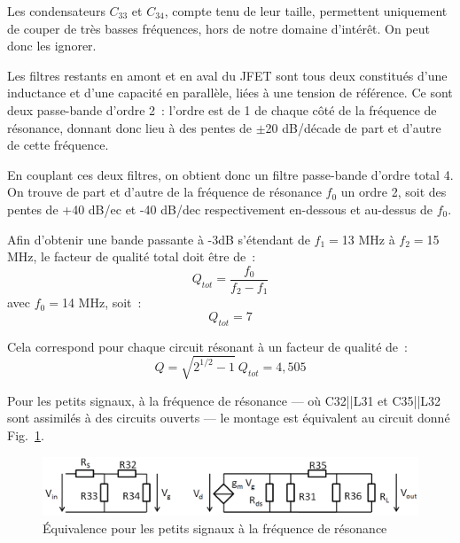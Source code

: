 \documentclass{article}
\begin{document}

Les condensateurs $C_{33}$ et $C_{34}$, compte tenu de leur taille, permettent uniquement de couper de très basses fréquences, hors de notre domaine d'intérêt. On peut donc les ignorer.

Les filtres restants en amont et en aval du JFET sont tous deux constitués d'une inductance et d'une capacité en parallèle, liées à une tension de référence. Ce sont deux passe-bande d'ordre 2~: l'ordre est de 1 de chaque côté de la fréquence de résonance, donnant donc lieu à des pentes de $\pm$20 dB/décade de part et d'autre de cette fréquence.

En couplant ces deux filtres, on obtient donc un filtre passe-bande d'ordre total 4. On trouve de part et d'autre de la fréquence de résonance $f_0$ un ordre 2, soit des pentes de +40 dB/ec et -40 dB/dec respectivement en-dessous et au-dessus de $f_0$.



Afin d'obtenir une bande passante à -3dB s'étendant de $f_1 = $13 MHz à $f_2 = $15 MHz, le facteur de qualité total doit être de~:
\begin{equation*}
Q_{tot} = \frac{f_0}{f_2-f_1}
\end{equation*}
avec $f_0 = $14 MHz, soit~:
\begin{equation*}
Q_{tot} = 7
\end{equation*}

Cela correspond pour chaque circuit résonant à un facteur de qualité de~:
\begin{equation*}
Q = \sqrt{2^{1/2}-1}~Q_{tot} = 4,505
\end{equation*}




Pour les petits signaux, à la fréquence de résonance --- où C32||L31 et C35||L32 sont assimilés à des circuits ouverts --- le montage est équivalent au circuit donné Fig.~\ref{fig:eqFET}.

\begin{figure}[h]
	\centering
	\includegraphics[width=.8\textwidth]{eqFet}
	\caption{Équivalence pour les petits signaux à la fréquence de résonance}
	\label{fig:eqFET}
\end{figure}
\end{document}
